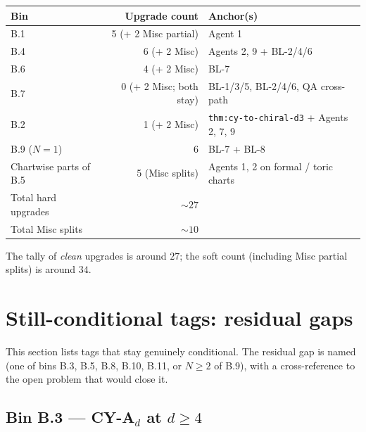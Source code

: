 \documentclass[11pt]{amsart}
\begin{document}
\begin{center}
\small
\begin{tabular}{@{}lrl@{}}
\toprule
Bin & Upgrade count & Anchor(s) \\
\midrule
B.1  & 5  (+ 2 Misc partial) & Agent 1 \\
B.4  & 6  (+ 2 Misc)          & Agents 2, 9 + BL-2/4/6 \\
B.6  & 4  (+ 2 Misc)          & BL-7 \\
B.7  & 0  (+ 2 Misc; both stay)  & BL-1/3/5, BL-2/4/6, QA cross-path \\
B.2  & 1  (+ 2 Misc)          & \texttt{thm:cy-to-chiral-d3} + Agents 2, 7, 9 \\
B.9 ($N=1$) & 6 & BL-7 + BL-8 \\
Chartwise parts of B.5 & 5 (Misc splits) & Agents 1, 2 on formal / toric charts \\
\midrule
Total hard upgrades & $\sim 27$ & \\
Total Misc splits & $\sim 10$ & \\
\bottomrule
\end{tabular}
\end{center}

The tally of \emph{clean} upgrades is around $27$; the soft count
(including Misc partial splits) is around $34$.

\section{Still-conditional tags: residual gaps}
\label{sec:residual-gaps}

This section lists tags that stay genuinely conditional. The residual
gap is named (one of bins B.3, B.5, B.8, B.10, B.11, or
$N \geq 2$ of B.9), with a cross-reference to the open problem that
would close it.

\subsection{Bin B.3 --- CY-A$_d$ at $d \geq 4$}
\label{subsec:still-b3}
\end{document}
